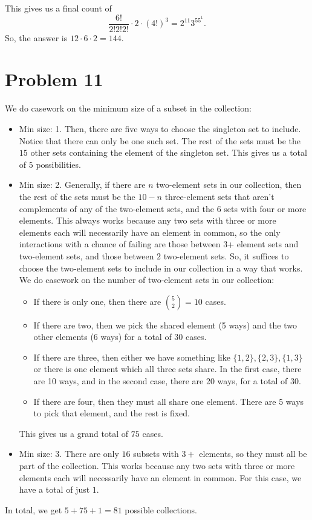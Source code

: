 \documentclass{scrartcl}
\begin{document}
This gives us a final count of
\[ \frac{6!}{2!2!2!} \cdot 2 \cdot (4!)^3 = 2^{11}3^55^1. \]
So, the answer is $12 \cdot 6 \cdot 2 = \boxed{144}$.

\section*{Problem 11}
We do casework on the minimum size of a subset in the collection:
\begin{itemize}
\item Min size: 1. Then, there are five ways to choose the singleton set to include.
Notice that there can only be one such set.
The rest of the sets must be the $15$ other sets containing the element of the singleton set.
This gives us a total of $5$ possibilities.
\item Min size: 2. Generally, if there are $n$ two-element sets in our collection,
then the rest of the sets must be the $10-n$ three-element sets that aren't complements
of any of the two-element sets, and the $6$ sets with four or more elements.
This always works because any two sets with three or more elements each will
necessarily have an element in common, so the only interactions with a chance of failing
are those between 3+ element sets and two-element sets, and those between $2$ two-element sets.
So, it suffices to choose the two-element sets to include in our collection in a way that works.
We do casework on the number of two-element sets in our collection:
\begin{itemize}
\item If there is only one, then there are $\binom52 = 10$ cases.
\item If there are two, then we pick the shared element (5 ways) and the two other elements (6 ways)
for a total of $30$ cases.
\item If there are three, then either we have something like $\{1,2\},\{2,3\},\{1,3\}$
or there is one element which all three sets share.
In the first case, there are 10 ways, and in the second case, there are 20 ways, for a total of $30$.
\item If there are four, then they must all share one element. There are 5 ways to pick that element,
and the rest is fixed.
\end{itemize}
This gives us a grand total of $75$ cases.
\item Min size: 3. There are only $16$ subsets with $3+$ elements, so they must all be part of the
collection. This works because any two sets with three or more elements each will
necessarily have an element in common. For this case, we have a total of just $1$.
\end{itemize}
In total, we get $5+75+1 = \boxed{81}$ possible collections.
\end{document}
